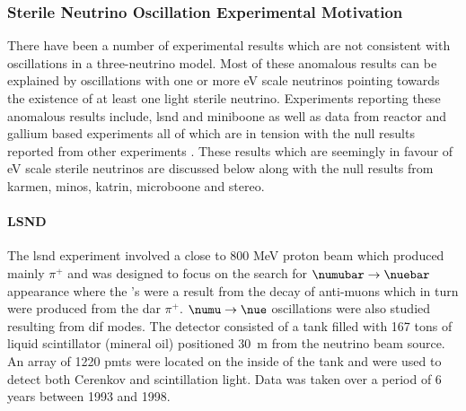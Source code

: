 \subsubsection{Sterile Neutrino Oscillation Experimental Motivation}\label{subchap:Motivation for Sterile Neutrinos}

There have been a number of experimental results which are not consistent with oscillations in a three-neutrino model. Most of these anomalous results can be explained by oscillations with one or more eV scale neutrinos pointing towards the existence of at least one light sterile neutrino. Experiments reporting these anomalous results include, \gls{lsnd} and \gls{miniboone} as well as data from reactor and gallium based experiments all of which are in tension with the null results reported from other experiments \cite{Where_are_we_with_light_sterile_neutrinos}. These results which are seemingly in favour of eV scale sterile neutrinos are discussed below along with the null results from \gls{karmen}, \gls{minos}, \gls{katrin}, \gls{microboone} and \gls{stereo}.

\paragraph{LSND}
The \gls{lsnd} experiment involved a close to 800 MeV proton beam which produced mainly $\pi^+$ and was designed to focus on the search for $\numubar \rightarrow \nuebar$ appearance where the \numubar's were a result from the decay of anti-muons which in turn were produced from the \gls{dar} $\pi^+$. $\numu \rightarrow \nue$ oscillations were also studied resulting from \gls{dif} modes. The detector consisted of a tank filled with 167 tons of liquid scintillator (mineral oil) positioned 30~m from the neutrino beam source. An array of 1220 \glspl{pmt} were located on the inside of the tank and were used to detect both Cerenkov and scintillation light. Data was taken over a period of 6 years between 1993 and 1998. 

